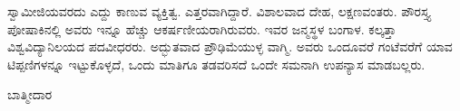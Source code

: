 ಸ್ವಾಮೀಜಿಯವರದು ಎದ್ದು ಕಾಣುವ ವ್ಯಕ್ತಿತ್ವ. ಎತ್ತರವಾಗಿದ್ದಾರೆ. ವಿಶಾಲವಾದ ದೇಹ, ಲಕ್ಷಣವಂತರು. ಪೌರಸ್ತ್ಯ ಪೋಷಾಕಿನಲ್ಲಿ ಅವರು ಇನ್ನೂ ಹೆಚ್ಚು ಆಕರ್ಷಣೀಯರಾಗಿರುವರು. ಇವರ ಜನ್ಮಸ್ಥಳ ಬಂಗಾಳ. ಕಲ್ಕತ್ತಾ ವಿಶ್ವವಿದ್ಯಾನಿಲಯದ ಪದವೀಧರರು. ಅದ್ಭುತವಾದ ಪ್ರೌಢಿಮೆಯುಳ್ಳ ವಾಗ್ಮಿ. ಅವರು ಒಂದೂವರೆ ಗಂಟೆವರೆಗೆ ಯಾವ ಟಿಪ್ಪಣಿಗಳನ್ನೂ ಇಟ್ಟುಕೊಳ್ಳದೆ, ಒಂದು ಮಾತಿಗೂ ತಡವರಿಸದೆ ಒಂದೇ ಸಮನಾಗಿ ಉಪನ್ಯಾಸ ಮಾಡಬಲ್ಲರು.

\begin{flushright}
ಬಾತ್ಮೀದಾರ
\end{flushright}

